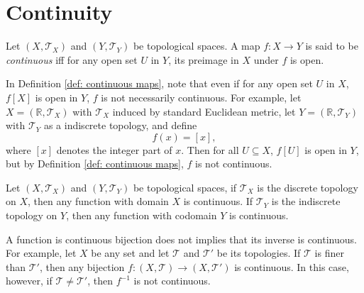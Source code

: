 \section{Continuity}

\begin{definition}
	\label{def: continuous maps}
	Let $(X, \mathcal T_X)$ and $(Y, \mathcal T_Y)$ be topological spaces. A map $f: X \to Y$ is said to be \textit{continuous} iff for any open set $U$ in $Y$, its preimage in $X$ under $f$ is open.
\end{definition}


\begin{note}
	In Definition \ref{def: continuous maps}, note that even if for any open set $U$ in $X$, $f[X]$ is open in $Y$, $f$ is not necessarily continuous. For example, let $X = (\mathbb R, \mathcal T_X)$ with $\mathcal T_X$ induced by standard Euclidean metric, let $Y=(\mathbb R, \mathcal T_Y)$ with $\mathcal T_Y$ as a indiscrete topology, and define
	$$
	f(x) = [x],
	$$
	where $[x]$ denotes the integer part of $x$. Then for all $U \subseteq X$, $f[U]$ is open in $Y$, but by Definition \ref{def: continuous maps}, $f$ is not continuous.
\end{note}


\begin{note}
	Let $(X, \mathcal T_X)$ and $(Y, \mathcal T_Y)$ be topological spaces, if $\mathcal T_X$ is the discrete topology on $X$, then any function with domain $X$ is continuous. If $\mathcal T_Y$ is the indiscrete topology on $Y$, then any function with codomain $Y$ is continuous.
\end{note}


\begin{note}
	A function is continuous bijection does not implies that its inverse is continuous. For example, let $X$ be any set and let $\mathcal T$ and $\mathcal T'$ be its topologies. If $\mathcal T$ is finer than $\mathcal T'$, then any bijection $f: (X, \mathcal T) \to (X, \mathcal T')$ is continuous. In this case, however, if $\mathcal T \ne \mathcal T'$, then $f^{-1}$ is not continuous.
\end{note}


